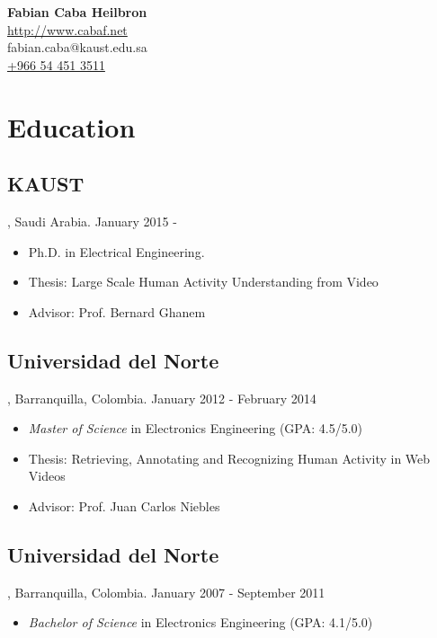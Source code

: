 \documentclass[letterpaper,10pt]{article}
\begin{document}
\begin{center}
  \Large 
  \textbf{Fabian Caba Heilbron} \\[1ex]
  \normalsize
  \url{http://www.cabaf.net} \\
  fabian.caba@kaust.edu.sa \\
  \href{tel:966544513511}{+966 54 451 3511}
\end{center}


\section{Education}

\subsection{KAUST}, Saudi Arabia. \hfill January 2015 - 

\begin{itemize}
  \item Ph.D. in Electrical Engineering.
  \item Thesis: Large Scale Human Activity Understanding from Video
  \item Advisor: Prof. Bernard Ghanem \\
  
\end{itemize}

\subsection{Universidad del Norte}, Barranquilla, Colombia. \hfill January 2012 - February 2014 

\begin{itemize}
  \item \textit{Master of Science} in Electronics Engineering (GPA: 4.5/5.0)
  \item Thesis: Retrieving, Annotating and Recognizing Human Activity in Web Videos
  \item Advisor: Prof. Juan Carlos Niebles \\
  
\end{itemize}

\subsection{Universidad del Norte}, Barranquilla, Colombia. \hfill January 2007 - September 2011 

\begin{itemize}
  \item \textit{Bachelor of Science} in Electronics Engineering (GPA: 4.1/5.0)
  
\end{itemize}
\end{document}
